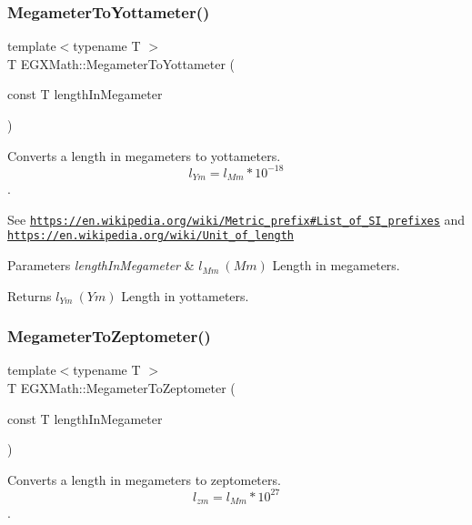 \subsubsection{\texorpdfstring{Megameter\+To\+Yottameter()}{MegameterToYottameter()}}
{\footnotesize\ttfamily template$<$typename T $>$ \\
T E\+G\+X\+Math\+::\+Megameter\+To\+Yottameter (\begin{DoxyParamCaption}\item[{const T}]{length\+In\+Megameter }\end{DoxyParamCaption})}



Converts a length in megameters to yottameters. \[ l_{Ym}=l_{Mm} * 10^{-18} \]. 

See \href{https://en.wikipedia.org/wiki/Metric_prefix#List_of_SI_prefixes}{\tt https\+://en.\+wikipedia.\+org/wiki/\+Metric\+\_\+prefix\#\+List\+\_\+of\+\_\+\+S\+I\+\_\+prefixes} and \href{https://en.wikipedia.org/wiki/Unit_of_length}{\tt https\+://en.\+wikipedia.\+org/wiki/\+Unit\+\_\+of\+\_\+length} 
\begin{DoxyParams}{Parameters}
{\em length\+In\+Megameter} & $ l_{Mm}\ (Mm)$ Length in megameters. \\
\hline
\end{DoxyParams}
\begin{DoxyReturn}{Returns}
$ l_{Ym}\ (Ym)$ Length in yottameters. 
\end{DoxyReturn}
\mbox{\label{group___e_g_x_math-_conversions-_length_conversions-_s_i-_megameter-_s_i_ga38fee336ea865f1f7ec6541c2256a8fe}} 
\subsubsection{\texorpdfstring{Megameter\+To\+Zeptometer()}{MegameterToZeptometer()}}
{\footnotesize\ttfamily template$<$typename T $>$ \\
T E\+G\+X\+Math\+::\+Megameter\+To\+Zeptometer (\begin{DoxyParamCaption}\item[{const T}]{length\+In\+Megameter }\end{DoxyParamCaption})}



Converts a length in megameters to zeptometers. \[ l_{zm}=l_{Mm} * 10^{27} \]. 

